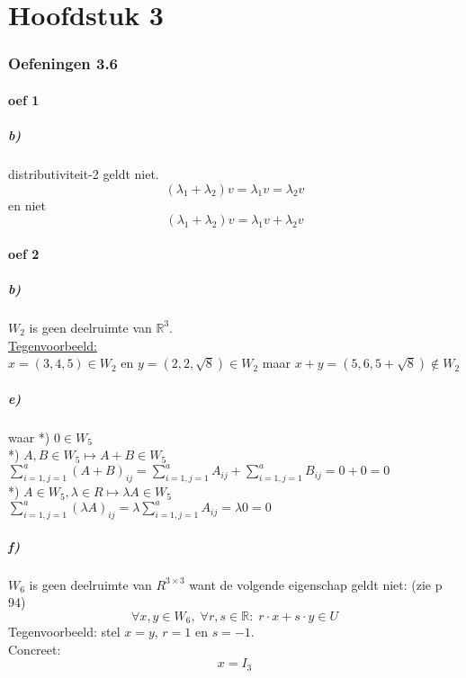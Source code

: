 \documentclass[lineaire_algebra_oplossingen.tex]{subfiles}
\begin{document}
\part{Hoofdstuk 3}
\section{Oefeningen 3.6}

\subsection{oef 1}
\subsubsection*{b)}
distributiviteit-2 geldt niet.
\[
(\lambda_1 + \lambda_2)v = \lambda_1v = \lambda_2v
\]
en niet
\[
(\lambda_1 + \lambda_2)v = \lambda_1v+\lambda_2v
\]

\subsection{oef 2}
\subsubsection*{b)}
$W_2$ is geen deelruimte van $\mathbb{R}^{3}$.\\
\underline{Tegenvoorbeeld:}\\
$x = (3, 4, 5) \in W_2$ en $y = (2, 2, \sqrt{8}) \in W_2$ maar $x + y = (5, 6, 5 + \sqrt{8}) \not \in W_2$

\subsubsection*{e) }
waar
*) $0 \in W_5$ \\
*) $A,B \in W_5 \longmapsto A+B \in W_5$ \\
$ \sum\limits_{i=1,j=1}^a (A+B)_{ij} = \sum\limits_{i=1,j=1}^a A_{ij} + \sum\limits_{i=1,j=1}^a B_{ij} = 0+0 = 0 $ \\
*) $ A \in W_5, \lambda \in R \longmapsto \lambda A \in W_5$ \\
$ \sum\limits_{i=1,j=1}^a (\lambda A)_{ij} = \lambda \sum\limits_{i=1,j=1}^a A_{ij} = \lambda 0 = 0$


\subsubsection*{f)}
$W_6$ is geen deelruimte van $R^{3\times 3}$ want de volgende eigenschap geldt niet: (zie p 94)
\[
\forall x,y\in W_6,\;\forall r,s\in\mathbb{R}:\; r\cdot x+s\cdot y\in U
\]
Tegenvoorbeeld:
stel $x=y$, $r=1$ en $s=-1$.\\
Concreet:
\[
x = I_3
\]
\end{document}
